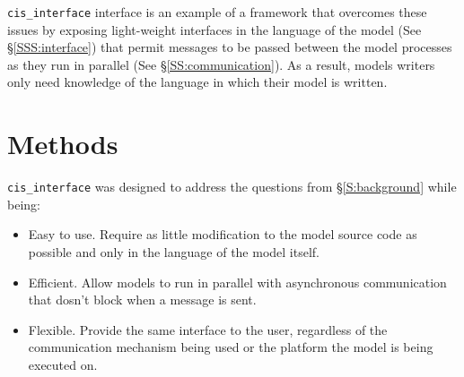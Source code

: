 \documentclass[journal]{IEEEtran}
\newcommand{\cis}{{\tt cis\_interface}{}}
\begin{document}
{\cis} interface is an example of a framework that overcomes these issues by exposing light-weight interfaces in the language of the model (See \S\ref{SSS:interface}) that permit messages to be passed between the model processes as they run in parallel (See \S\ref{SS:communication}). As a result, models writers only need knowledge of the language in which their model is written.

%

\section{Methods}\label{S:methods}

{\cis} was designed to address the questions from \S\ref{S:background} while being:

\begin{itemize}
	\item Easy to use. Require as little modification to the model source code as possible and only in the language of the model itself.
	\item Efficient. Allow models to run in parallel with asynchronous communication that dosn't block when a message is sent.
	\item Flexible. Provide the same interface to the user, regardless of the communication mechanism being used or the platform the model is being executed on.
\end{itemize}
\end{document}
